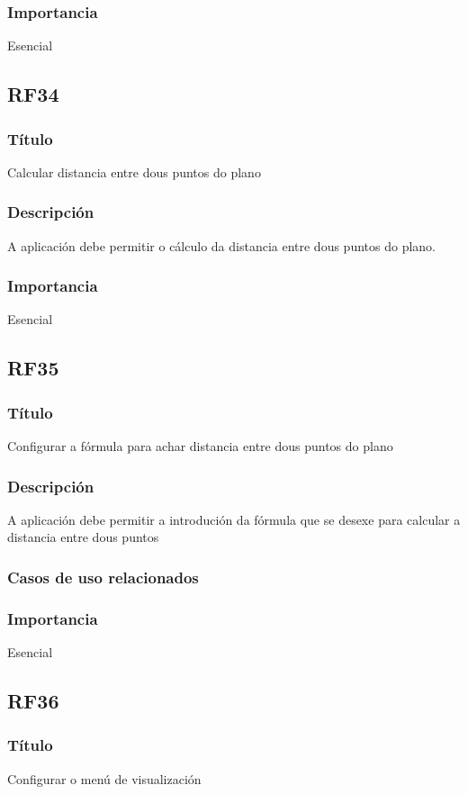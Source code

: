 \subsubsection{Importancia}
Esencial

\subsection{RF34}
\subsubsection{Título}
Calcular distancia entre dous puntos do plano
\subsubsection{Descripción}
A aplicación debe permitir o cálculo da distancia entre dous puntos do plano.
\subsubsection{Importancia}
Esencial

\subsection{RF35}
\subsubsection{Título}
Configurar a fórmula para achar distancia entre dous puntos do plano
\subsubsection{Descripción}
A aplicación debe permitir a introdución da fórmula que se desexe para calcular a distancia entre dous puntos
\subsubsection{Casos de uso relacionados}
\subsubsection{Importancia}
Esencial

\subsection{RF36}
\subsubsection{Título}
Configurar o menú de visualización
